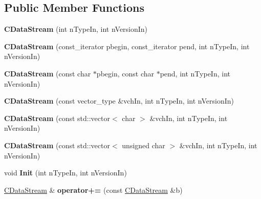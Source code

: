 \subsection*{Public Member Functions}
\begin{DoxyCompactItemize}
\item 
\mbox{\label{class_c_data_stream_a38f4d7d2ae59566a0500523a1b1a49d4}} 
{\bfseries C\+Data\+Stream} (int n\+Type\+In, int n\+Version\+In)
\item 
\mbox{\label{class_c_data_stream_a00d23d0ef651cb4ea54cb37009bdf8f2}} 
{\bfseries C\+Data\+Stream} (const\+\_\+iterator pbegin, const\+\_\+iterator pend, int n\+Type\+In, int n\+Version\+In)
\item 
\mbox{\label{class_c_data_stream_ab345d2edd7bef6c6c140a46621e49eee}} 
{\bfseries C\+Data\+Stream} (const char $\ast$pbegin, const char $\ast$pend, int n\+Type\+In, int n\+Version\+In)
\item 
\mbox{\label{class_c_data_stream_a38a51fefce23374963516b3af03638fc}} 
{\bfseries C\+Data\+Stream} (const vector\+\_\+type \&vch\+In, int n\+Type\+In, int n\+Version\+In)
\item 
\mbox{\label{class_c_data_stream_a46219676397ae7b3cbc0c676f74ba1e7}} 
{\bfseries C\+Data\+Stream} (const std\+::vector$<$ char $>$ \&vch\+In, int n\+Type\+In, int n\+Version\+In)
\item 
\mbox{\label{class_c_data_stream_ac63bd3d0ecce0edc2aa66cc80b633b6f}} 
{\bfseries C\+Data\+Stream} (const std\+::vector$<$ unsigned char $>$ \&vch\+In, int n\+Type\+In, int n\+Version\+In)
\item 
\mbox{\label{class_c_data_stream_a95267358054cbfbf37e239f3e6c78471}} 
void {\bfseries Init} (int n\+Type\+In, int n\+Version\+In)
\item 
\mbox{\label{class_c_data_stream_a59c13d9215c13b3bb4d56a818d280dda}} 
\mbox{\hyperlink{class_c_data_stream}{C\+Data\+Stream}} \& {\bfseries operator+=} (const \mbox{\hyperlink{class_c_data_stream}{C\+Data\+Stream}} \&b)
\item 

\end{DoxyCompactItemize}
